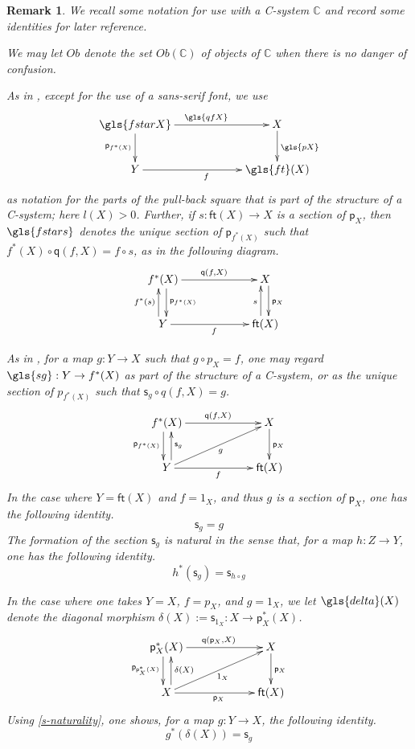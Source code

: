 \documentclass[12pt]{article}
\numberwithin{equation}{section}
\newenvironment{eq}{\begin{equation}}{\end{equation}}
\newtheorem{remark}[proposition]{Remark}
\newcommand{\sr}{\rightarrow}
\newcommand{\CC}{{\mathbb C}}  %
\newcommand{\id}{1}            %
\newcommand{\ft}{\mathsf{ft}}
\newcommand{\p}{\mathsf{p}}
\newcommand{\q}{\mathsf{q}}
\newcommand{\s}{\mathsf{s}}     %
\newcommand{\Ob}{Ob}
\begin{document}
\begin{remark}
  We recall some notation for use with a C-system $\CC$ and record some identities for later reference.

  We may let $\Ob$ denote the set $\Ob(\CC)$ of objects of $\CC$ when there is no danger of confusion.

  As in \cite[Def.~2.1 and Prop.~2.4]{Csubsystems}, except for the use of a sans-serif font, we use
  \begin{eq}
    \xymatrix@C=5pc{
      \gls{fstarX} \ar[r]^{\gls{qfX}} \ar[d]_{\p_{f^*(X)}}  & X \ar[d]^{\gls{pX}} \\
      Y \ar[r]_f & \gls{ft}(X)
    }
  \end{eq}%
  as notation for the parts of the pull-back square that is part of the
  structure of a C-system; here $l(X) > 0$.
  Further, if $s : \ft(X) \sr X$ is a section of $\p_X$, then $\gls{fstars}$ denotes
  the unique section of $\p_{f^*(X)}$ such that $f^*(X) \circ \q(f,X) = f \circ
  s$, as in the following diagram.
  \begin{eq}
    \xymatrix@C=5pc{
      f^*(X) \ar[r]^{\q(f,X)} \ar@<3pt>[d]^{\p_{f^*(X)}}  & X \ar@<3pt>[d]^{\p_X} \\
      Y \ar[r]_f \ar@<4pt>[u]^{f^*(s)} & \ft(X) \ar@<4pt>[u]^s
    }
  \end{eq}%

  As in \cite[Def.~2.3 and Prop.~2.4]{Csubsystems}, for a map $g : Y \sr X$
  such that $g \circ p_X = f$, one may regard
  $\gls{sg} : Y \sr f^*(X)$ as part of the structure of a C-system, or
  as the unique section of $p_{f^*(X)}$ such that $\s_g \circ q(f,X) = g$.
  \begin{eq}
    \xymatrix@C=5pc{
      f^*(X) \ar[r]^{\q(f,X)} \ar@<-3pt>[d]_{\p_{f^*(X)}} & X \ar[d]^{\p_X} \\
      Y \ar[ru]_g \ar[r]_f \ar@<-4pt>[u]_{\s_g} & \ft(X)
    }
  \end{eq}%
  In the case where $Y = \ft(X)$ and $f = 1_X$, and thus $g$ is a section of $\p_X$,
  one has the following identity.
  \begin{eq}
    \label{section-section}
    \s_g = g
  \end{eq}%
  The formation of the section $\s_g$ is natural in the sense that, for a map
  $h : Z \to Y$, one has the following identity.
  \begin{eq}
    \label{s-naturality}
    h^* (\s_g) = \s_{h \circ g}
  \end{eq}%

  In the case where one takes $Y=X$, $f=p_X$, and $g = 1_X$, we let $\gls{delta}(X)$ denote
  the diagonal morphism $\delta(X) := \s_{\id_X} : X\sr \p_X^*(X)$.
  \begin{eq}
    \xymatrix@C=5pc{
      \p_X^*(X) \ar[r]^{\q(\p_X,X)} \ar@<-3pt>[d]_{\p_{\p_X^*(X)}} & X \ar[d]^{\p_X} \\
      X \ar[ru]_{1_X} \ar[r]_{\p_X} \ar@<-4pt>[u]_{\delta(X)} & \ft(X)
    }
  \end{eq}%
  Using \eqref{s-naturality}, one shows, for a map $g : Y \to X$, the following identity.
  \begin{eq}
    \label{delta-pullback}
    g^* (\delta(X)) = \s_g
  \end{eq}%


\end{remark}
\end{document}
